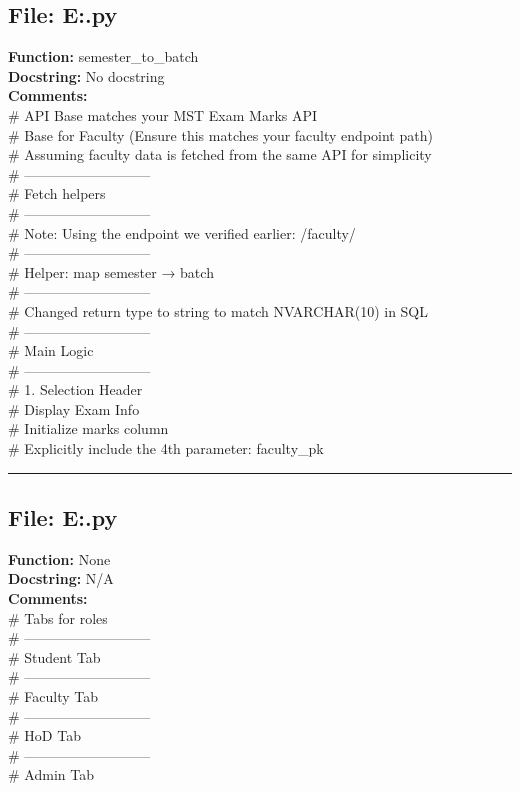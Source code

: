 {\subsection*{File: E:\project\capstone\frontend\mem.py}
\textbf{Function:} semester_to_batch\\
\textbf{Docstring:} No docstring\\
\textbf{Comments:}\\
# API Base matches your MST Exam Marks API\\
# Base for Faculty (Ensure this matches your faculty endpoint path)\\
# Assuming faculty data is fetched from the same API for simplicity\\
# ---------------------------\\
# Fetch helpers\\
# ---------------------------\\
# Note: Using the endpoint we verified earlier: /faculty/\\
# ---------------------------\\
# Helper: map semester → batch\\
# ---------------------------\\
# Changed return type to string to match NVARCHAR(10) in SQL\\
# ---------------------------\\
# Main Logic\\
# ---------------------------\\
# 1. Selection Header\\
# Display Exam Info\\
# Initialize marks column\\
# Explicitly include the 4th parameter: faculty\_pk\\

\hrule

\subsection*{File: E:\project\capstone\frontend\test.py}
\textbf{Function:} None\\
\textbf{Docstring:} N/A\\
\textbf{Comments:}\\
# Tabs for roles\\
# ---------------------------\\
# Student Tab\\
# ---------------------------\\
# Faculty Tab\\
# ---------------------------\\
# HoD Tab\\
# ---------------------------\\
# Admin Tab\\

}
